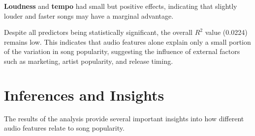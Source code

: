 \documentclass[12pt,a4paper]{article}
\begin{document}
\textbf{Loudness} and \textbf{tempo} had small but positive effects,
indicating that slightly louder and faster songs may have a marginal
advantage.

Despite all predictors being statistically significant, the overall
$R^2$ value (0.0224) remains low. This indicates that audio features
alone explain only a small portion of the variation in song popularity,
suggesting the influence of external factors such as marketing, artist
popularity, and release timing.
\section{Inferences and Insights}

The results of the analysis provide several important insights into how
different audio features relate to song popularity.
\end{document}
